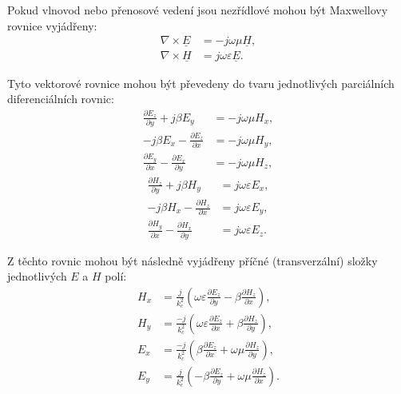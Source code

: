 \documentclass[12pt,a4paper,oneside]{article}
\numberwithin{equation}{section} %
\numberwithin{figure}{section} %
\numberwithin{table}{section} %
\newcommand{\faz}[1]{{\underline{#1}}} %
\begin{document}
Pokud vlnovod nebo přenosové vedení jsou nezřídlové mohou být Maxwellovy rovnice vyjádřeny:
\begin{subequations}
\label{maxvektor2}
\begin{align}
\nabla \times \faz{E} &= -j\omega \mu \faz{H} ,
\\
\nabla \times \faz{H} &= j\omega \varepsilon \faz{E} .
\end{align}
\end{subequations}

Tyto vektorové rovnice mohou být převedeny do tvaru jednotlivých parciálních diferenciálních rovnic:
\begin{subequations}
\begin{align}
\frac{\partial E_z}{\partial y} + j \beta E_y &= -j \omega \mu H_x ,
\label{maxpart1}
\\
-j \beta E_x - \frac{\partial E_z}{\partial x} &= - j \omega \mu H_y ,
\\
\frac{\partial E_y}{\partial x} - \frac{\partial E_x}{\partial y} &= -j \omega \mu H_z ,
\end{align}
\end{subequations}
\begin{subequations}
\begin{align}
\frac{\partial H_z}{\partial y} + j \beta H_y &= j \omega \varepsilon E_x ,
\label{maxpart4}
\\
-j \beta H_x - \frac{\partial H_z}{\partial x} &= j \omega \varepsilon E_y ,
\label{maxpart5}
\\
\frac{\partial H_y}{\partial x} - \frac{\partial H_x}{\partial y} &= j \omega \varepsilon E_z .
\end{align}
\end{subequations}

Z těchto rovnic mohou být následně vyjádřeny příčné (transverzální) složky jednotlivých $E$ a $H$ polí:
\begin{subequations}
\label{vyjadreno}
\begin{align}
H_x &= \frac{j}{k^2_c} \left( \omega \varepsilon \frac{\partial E_z}{\partial y} - \beta \frac{\partial H_z}{\partial x} \right) ,
\\
H_y &= \frac{-j}{k^2_c} \left( \omega \varepsilon \frac{\partial E_z}{\partial x} + \beta \frac{\partial H_z}{\partial y} \right) ,
\\
E_x &= \frac{-j}{k^2_c} \left( \beta \frac{\partial E_z}{\partial x} + \omega \mu \frac{\partial H_z}{\partial y} \right) ,
\\
E_y &= \frac{j}{k^2_c} \left(- \beta \frac{\partial E_z}{\partial y} + \omega \mu \frac{\partial H_z}{\partial x} \right) .
\end{align}
\end{subequations}
\end{document}
